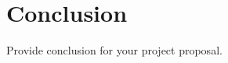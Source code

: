 \documentclass[12pt, a4paper]{report}
\begin{document}


\chapter{Conclusion} %
\label{cha:conclusion}
Provide conclusion for your project proposal.

\printbibliography
\end{document}
